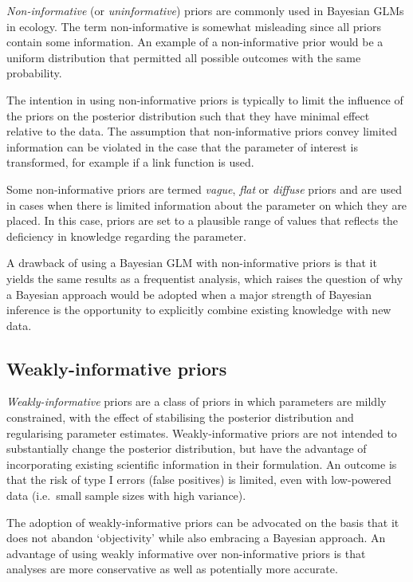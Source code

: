 \documentclass[
]{book}
\begin{document}
\emph{Non-informative} (or \emph{uninformative}) priors are commonly used in Bayesian GLMs in ecology. The term non-informative is somewhat misleading since all priors contain some information. An example of a non-informative prior would be a uniform distribution that permitted all possible outcomes with the same probability.

The intention in using non-informative priors is typically to limit the influence of the priors on the posterior distribution such that they have minimal effect relative to the data. The assumption that non-informative priors convey limited information can be violated in the case that the parameter of interest is transformed, for example if a link function is used.

Some non-informative priors are termed \emph{vague}, \emph{flat} or \emph{diffuse} priors and are used in cases when there is limited information about the parameter on which they are placed. In this case, priors are set to a plausible range of values that reflects the deficiency in knowledge regarding the parameter.

A drawback of using a Bayesian GLM with non-informative priors is that it yields the same results as a frequentist analysis, which raises the question of why a Bayesian approach would be adopted when a major strength of Bayesian inference is the opportunity to explicitly combine existing knowledge with new data.

\hypertarget{weak-priors}{%
\subsection{Weakly-informative priors}\label{weak-priors}}

\emph{Weakly-informative} priors are a class of priors in which parameters are mildly constrained, with the effect of stabilising the posterior distribution and regularising parameter estimates. Weakly-informative priors are not intended to substantially change the posterior distribution, but have the advantage of incorporating existing scientific information in their formulation. An outcome is that the risk of type I errors (false positives) is limited, even with low-powered data (i.e.~small sample sizes with high variance).

The adoption of weakly-informative priors can be advocated on the basis that it does not abandon `objectivity' while also embracing a Bayesian approach. An advantage of using weakly informative over non-informative priors is that analyses are more conservative as well as potentially more accurate.
\end{document}
